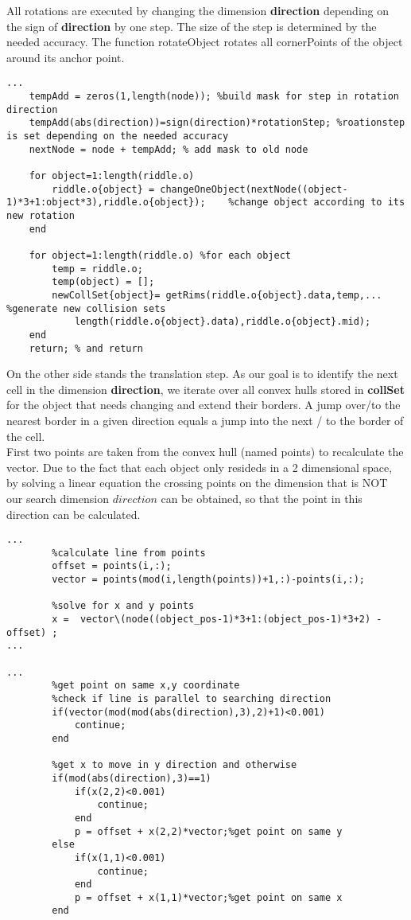 All rotations are executed by changing the dimension \textbf{direction}  depending on the sign of \textbf{direction} by one step. The size of the step is determined 
by the needed accuracy. The function rotateObject rotates all cornerPoints of the object around its anchor point.\\
\begin{lstlisting}
...
    tempAdd = zeros(1,length(node)); %build mask for step in rotation direction
    tempAdd(abs(direction))=sign(direction)*rotationStep; %roationstep is set depending on the needed accuracy
    nextNode = node + tempAdd; % add mask to old node

    for object=1:length(riddle.o)
        riddle.o{object} = changeOneObject(nextNode((object-1)*3+1:object*3),riddle.o{object});    %change object according to its new rotation
    end
    
    for object=1:length(riddle.o) %for each object 
        temp = riddle.o;
        temp(object) = [];
        newCollSet{object}= getRims(riddle.o{object}.data,temp,... %generate new collision sets
            length(riddle.o{object}.data),riddle.o{object}.mid);
    end
    return; % and return
\end{lstlisting}
On the other side stands the translation step. As our goal is to identify the next cell in the dimension \textbf{direction}, we iterate over all convex hulls stored in \textbf{collSet} for the object that needs changing and extend their borders. A jump over/to the nearest border in a given direction equals a jump into the next / to the border of the cell.\\
First two points are taken from the convex hull (named points) to recalculate the vector. Due to the fact that each object only resideds in a 2 dimensional space, by solving a linear equation the crossing points on the dimension that is NOT our search dimension $direction$ can be obtained, so that the point in this direction can be calculated.
\begin{lstlisting}
...
        %calculate line from points
        offset = points(i,:);
        vector = points(mod(i,length(points))+1,:)-points(i,:);

        %solve for x and y points
        x =  vector\(node((object_pos-1)*3+1:(object_pos-1)*3+2) - offset) ;
...    
    
...        
        %get point on same x,y coordinate
        %check if line is parallel to searching direction
        if(vector(mod(mod(abs(direction),3),2)+1)<0.001)
            continue;
        end

        %get x to move in y direction and otherwise
        if(mod(abs(direction),3)==1)
            if(x(2,2)<0.001)
                continue;
            end
            p = offset + x(2,2)*vector;%get point on same y
        else
            if(x(1,1)<0.001)
                continue;
            end
            p = offset + x(1,1)*vector;%get point on same x
        end
 \end{lstlisting}
